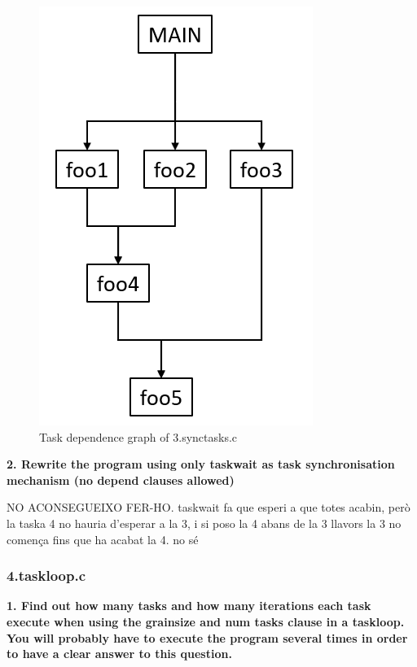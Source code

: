 \documentclass[12]{article}
\begin{document}
\begin{figure}[H]
\centering
\includegraphics[scale=0.5]{images/task_dependence_graph_synctasks.png}
\caption{Task dependence graph of 3.synctasks.c}
\label{task_dependence_graph_synctasks}
\end{figure}

\textbf{2. Rewrite the program using only taskwait as task synchronisation mechanism (no depend clauses allowed)}

NO ACONSEGUEIXO FER-HO. taskwait fa que esperi a que totes acabin, però la taska 4 no hauria d'esperar a la 3, i si poso la 4 abans de la 3 llavors la 3 no comença fins que ha  acabat la 4. no sé

\subsubsection{4.taskloop.c}
\textbf{1. Find out how many tasks and how many iterations each task execute when using the grainsize
and num tasks clause in a taskloop. You will probably have to execute the program several times in order to have a clear answer to this question.}
\end{document}

